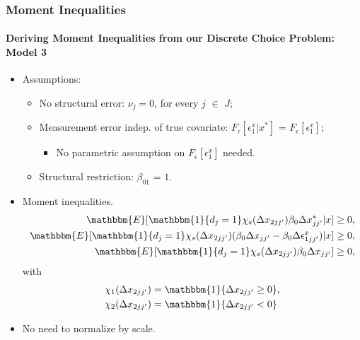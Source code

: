 \begin{frame}
\frametitle{Moment Inequalities}
\framesubtitle{Deriving Moment Inequalities from our Discrete Choice Problem: Model 3}

\begin{itemize}
	\item Assumptions:
	\begin{itemize}
		\item No structural error: $\nu_{j} = 0$, for every $j$ $\in$ $J$;
		\item Measurement error indep. of true covariate: $F_{\epsilon}[\epsilon^{x}_{1}|x^{*}]$ = $F_{\epsilon}[\epsilon^{x}_{1}]$;
		\begin{itemize}
			\item No parametric assumption on $F_{\epsilon}[\epsilon^{x}_{1}]$ needed.
		\end{itemize}
		\item Structural restriction: $\beta_{01}$ = $1$.
	\end{itemize}
	\item Moment inequalities. 
	\begin{align*}
	\mathbbm{E}[\mathbbm{1}\{d_{j}=1\}\chi_{s}(\Delta x_{2jj'})\beta_{0}\Delta x^{*}_{jj'}|x]&\geq 0,\\
	\mathbbm{E}[\mathbbm{1}\{d_{j}=1\}\chi_{s}(\Delta x_{2jj'})(\beta_{0}\Delta x_{jj'}-\beta_{0}\Delta \epsilon^{x}_{1jj'})|x]&\geq 0,\\
	\mathbbm{E}[\mathbbm{1}\{d_{j}=1\}\chi_{s}(\Delta x_{2jj'})\beta_{0}\Delta x_{jj'}]&\geq 0,
	\end{align*}
	with
	\begin{align*}
	\chi_{1}(\Delta x_{2jj'}) &= \mathbbm{1}\{\Delta x_{2jj'}\geq 0\},\\
	\chi_{2}(\Delta x_{2jj'}) &= \mathbbm{1}\{\Delta x_{2jj'}<0\}
	\end{align*}
	\item No need to normalize by scale.
\end{itemize}
\end{frame}

